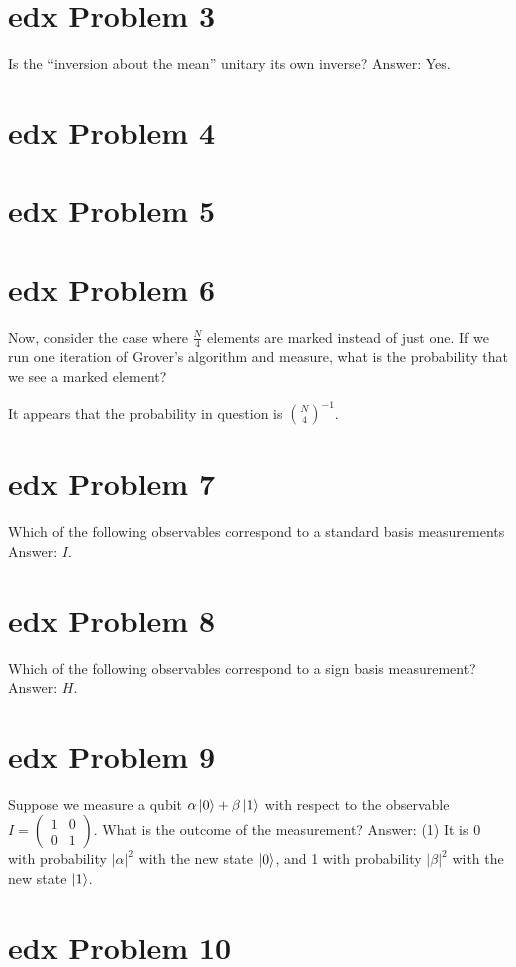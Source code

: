 \documentclass[10pt]{article}
\begin{document}
\section*{edx Problem 3}
Is the ``inversion about the mean'' unitary its own inverse? Answer: Yes.

\section*{edx Problem 4}

\section*{edx Problem 5}

\section*{edx Problem 6}
Now, consider the case where $\frac{N}{4}$ elements are marked instead of just one. If we run one iteration of Grover's algorithm and measure, what is the probability that we see a marked element?

It appears that the probability in question is $\binom{N}{4}^{-1}$.

\section*{edx Problem 7}
Which of the following observables correspond to a standard basis measurements Answer: $I$.

\section*{edx Problem 8}
Which of the following observables correspond to a sign basis measurement? Answer: $H$.

\section*{edx Problem 9}
Suppose we measure a qubit $\alpha \ket{0} + \beta \ket{1}$ with respect to the observable $I = \begin{pmatrix}
1 & 0 \\ 0 & 1
\end{pmatrix}.$ What is the outcome of the measurement? Answer: (1) It is 0 with probability $|\alpha|^2$ with the new state $\ket{0}$, and 1 with probability $|\beta|^2$ with the new state $\ket{1}$.

\section*{edx Problem 10}
\end{document}
